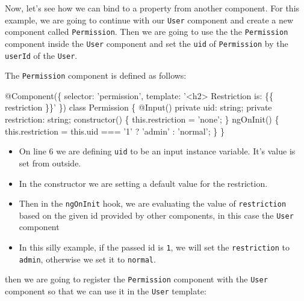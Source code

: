 \documentclass[12pt,]{article}
\newenvironment{Shaded}{}{}
\newcommand{\KeywordTok}[1]{\textcolor[rgb]{0.00,0.00,1.00}{{#1}}}
\newcommand{\DecValTok}[1]{{#1}}
\newcommand{\FunctionTok}[1]{{#1}}
\newcommand{\NormalTok}[1]{{#1}}
\providecommand{\tightlist}{%
  \setlength{\itemsep}{0pt}\setlength{\parskip}{0pt}}
\begin{document}
Now, let's see how we can bind to a property from another component. For
this example, we are going to continue with our \texttt{User} component
and create a new component called \texttt{Permission}. Then we are going
to use the the \texttt{Permission} component inside the \texttt{User}
component and set the \texttt{uid} of \texttt{Permission} by the
\texttt{userId} of the \texttt{User}.

The \texttt{Permission} component is defined as follows:

\begin{Shaded}
\begin{Highlighting}[numbers=left,,]
\FunctionTok{@Component}\NormalTok{(\{}
  \NormalTok{selector: 'permission',}
  \NormalTok{template: '<h2> Restriction is: \{\{ restriction \}\}'}
\NormalTok{\})}
\KeywordTok{class} \NormalTok{Permission \{}
  \FunctionTok{@Input}\NormalTok{() }\KeywordTok{private} \NormalTok{uid: string;}
  \KeywordTok{private} \NormalTok{restriction: string;}
  \FunctionTok{constructor}\NormalTok{() \{}
    \KeywordTok{this}\NormalTok{.}\FunctionTok{restriction} \NormalTok{= 'none';}
  \NormalTok{\}}
  \FunctionTok{ngOnInit}\NormalTok{() \{}
    \KeywordTok{this}\NormalTok{.}\FunctionTok{restriction} \NormalTok{= }\KeywordTok{this}\NormalTok{.}\FunctionTok{uid} \NormalTok{=== '}\DecValTok{1}\NormalTok{' ? 'admin' : 'normal';}
  \NormalTok{\}}
\NormalTok{\}}
\end{Highlighting}
\end{Shaded}

\begin{itemize}
\tightlist
\item
  On line 6 we are defining \texttt{uid} to be an input instance
  variable. It's value is set from outside.
\item
  In the constructor we are setting a default value for the restriction.
\item
  Then in the \texttt{ngOnInit} hook, we are evaluating the value of
  \texttt{restriction} based on the given id provided by other
  components, in this case the \texttt{User} component
\item
  In this silly example, if the passed id is \texttt{1}, we will set the
  \texttt{restriction} to \texttt{admin}, otherwise we set it to
  \texttt{normal}.
\end{itemize}

then we are going to register the \texttt{Permission} component with the
\texttt{User} component so that we can use it in the \texttt{User}
template:
\end{document}

